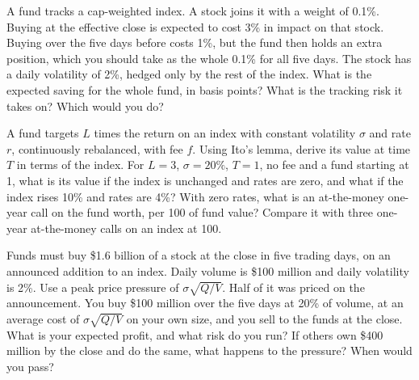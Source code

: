 \begin{question}\label{iq:iv2:etfs-futures-and-index-arbitrage:33}
A fund tracks a cap-weighted index. A stock joins it with a weight of 0.1\%. Buying at the effective close is expected to cost 3\% in impact on that stock. Buying over the five days before costs 1\%, but the fund then holds an extra position, which you should take as the whole 0.1\% for all five days. The stock has a daily volatility of 2\%, hedged only by the rest of the index. What is the expected saving for the whole fund, in basis points? What is the tracking risk it takes on? Which would you do?
\end{question}

\begin{question}\label{iq:iv2:etfs-futures-and-index-arbitrage:34}
A fund targets $L$ times the return on an index with constant volatility $\sigma$ and rate $r$, continuously rebalanced, with fee $f$. Using Ito's lemma, derive its value at time $T$ in terms of the index. For $L = 3$, $\sigma = 20\%$, $T = 1$, no fee and a fund starting at 1, what is its value if the index is unchanged and rates are zero, and what if the index rises 10\% and rates are 4\%? With zero rates, what is an at-the-money one-year call on the fund worth, per 100 of fund value? Compare it with three one-year at-the-money calls on an index at 100.
\end{question}

\begin{question}\label{iq:iv2:etfs-futures-and-index-arbitrage:35}
Funds must buy \$1.6 billion of a stock at the close in five trading days, on an announced addition to an index. Daily volume is \$100 million and daily volatility is 2\%. Use a peak price pressure of $\sigma\sqrt{Q/V}$. Half of it was priced on the announcement. You buy \$100 million over the five days at 20\% of volume, at an average cost of $\sigma\sqrt{Q/V}$ on your own size, and you sell to the funds at the close. What is your expected profit, and what risk do you run? If others own \$400 million by the close and do the same, what happens to the pressure? When would you pass?
\end{question}
